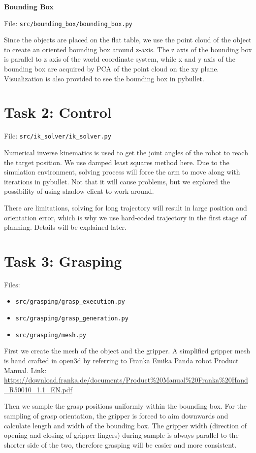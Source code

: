 \documentclass[
	english,
	accentcolor=11d,%
	type=intern,
	marginpar=false,
    logofile=media/PEARLTUDA.png
	]{tudapub}
\let\code\texttt
\begin{document}
\vspace{0.5cm}
\noindent\textbf{Bounding Box}

\noindent File: \code{src/bounding\_box/bounding\_box.py}

Since the objects are placed on the flat table, we use the point cloud of the object to create an oriented bounding box around z-axis. The z axis of the bounding box is parallel to z axis of the world coordinate system, while x and y axis of the bounding box are acquired by PCA of the point cloud on the xy plane. Visualization is also provided to see the bounding box in pybullet.

\section{Task 2: Control}
\noindent File: \code{src/ik\_solver/ik\_solver.py}

Numerical inverse kinematics is used to get the joint angles of the robot to reach the target position. We use damped least squares method here. Due to the simulation environment, solving process will force the arm to move along with iterations in pybullet. Not that it will cause problems, but we explored the possibility of using shadow client to work around. 

There are limitations, solving for long trajectory will result in large position and orientation error, which is why we use hard-coded trajectory in the first stage of planning. Details will be explained later.

\section{Task 3: Grasping}
Files: 
\begin{itemize}
\item \code{src/grasping/grasp\_execution.py}
\item \code{src/grasping/grasp\_generation.py}
\item \code{src/grasping/mesh.py}
\end{itemize}

First we create the mesh of the object and the gripper. A simplified gripper mesh is hand crafted in open3d by referring to Franka Emika Panda robot Product Manual.
Link: \url{https://download.franka.de/documents/Product\%20Manual\%20Franka\%20Hand_R50010_1.1_EN.pdf}

Then we sample the grasp positions uniformly within the bounding box. For the sampling of grasp orientation, the gripper is forced to aim downwards and calculate length and width of the bounding box. The gripper width (direction of opening and closing of gripper fingers) during sample is always parallel to the shorter side of the two, therefore grasping will be easier and more consistent.
\end{document}
